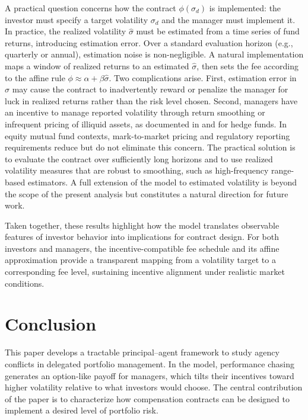 A practical question concerns how the contract \(\phi(\sigma_d)\) is
implemented: the investor must specify a target volatility \(\sigma_d\)
and the manager must implement it. In practice, the realized volatility
\(\hat{\sigma}\) must be estimated from a time series of fund returns,
introducing estimation error. Over a standard evaluation horizon (e.g.,
quarterly or annual), estimation noise is non-negligible. A natural
implementation maps a window of realized returns to an estimated
\(\hat{\sigma}\), then sets the fee according to the affine rule
\(\phi \approx \alpha + \beta\hat{\sigma}\). Two complications arise.
First, estimation error in \(\hat{\sigma}\) may cause the contract to
inadvertently reward or penalize the manager for luck in realized
returns rather than the risk level chosen. Second, managers have an
incentive to manage reported volatility through return smoothing or
infrequent pricing of illiquid assets, as documented in
\citet{GetmanskyLoMakarov2004} and \citet{BollenPool2009} for hedge
funds. In equity mutual fund contexts, mark-to-market pricing and
regulatory reporting requirements reduce but do not eliminate this
concern. The practical solution is to evaluate the contract over
sufficiently long horizons and to use realized volatility measures that
are robust to smoothing, such as high-frequency range-based estimators.
A full extension of the model to estimated volatility is beyond the
scope of the present analysis but constitutes a natural direction for
future work.

Taken together, these results highlight how the model translates
observable features of investor behavior into implications for contract
design. For both investors and managers, the incentive-compatible fee
schedule and its affine approximation provide a transparent mapping from
a volatility target to a corresponding fee level, sustaining incentive
alignment under realistic market conditions.

\section{Conclusion}\label{sec:conclusion}

This paper develops a tractable principal--agent framework to study
agency conflicts in delegated portfolio management. In the model,
performance chasing generates an option-like payoff for managers, which
tilts their incentives toward higher volatility relative to what
investors would choose. The central contribution of the paper is to
characterize how compensation contracts can be designed to implement a
desired level of portfolio risk.


